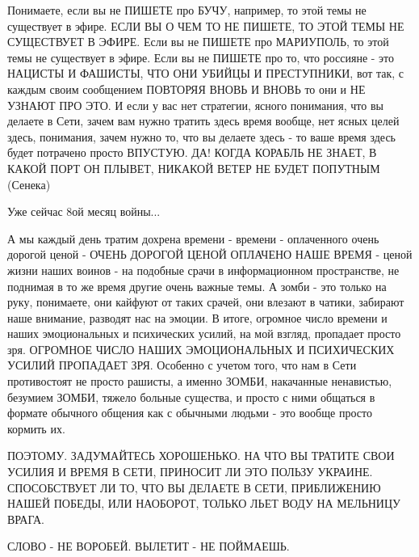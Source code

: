 Понимаете, если вы не ПИШЕТЕ про БУЧУ, например, то этой темы не существует в
эфире. ЕСЛИ ВЫ О ЧЕМ ТО НЕ ПИШЕТЕ, ТО ЭТОЙ ТЕМЫ НЕ СУЩЕСТВУЕТ В ЭФИРЕ. Если вы
не ПИШЕТЕ про МАРИУПОЛЬ, то этой темы не существует в эфире. Если вы не ПИШЕТЕ
про то, что россияне - это НАЦИСТЫ И ФАШИСТЫ, ЧТО ОНИ УБИЙЦЫ И ПРЕСТУПНИКИ, вот
так, с каждым своим сообщением ПОВТОРЯЯ ВНОВЬ И ВНОВЬ то они и НЕ УЗНАЮТ ПРО
ЭТО. И если у вас нет стратегии, ясного понимания, что вы делаете в Сети, зачем
вам нужно тратить здесь время вообще, нет ясных целей здесь, понимания, зачем
нужно то, что вы делаете здесь - то ваше время здесь будет потрачено просто
ВПУСТУЮ. ДА! КОГДА КОРАБЛЬ НЕ ЗНАЕТ, В КАКОЙ ПОРТ ОН ПЛЫВЕТ, НИКАКОЙ ВЕТЕР НЕ
БУДЕТ ПОПУТНЫМ (Сенека)

Уже сейчас 8ой месяц войны...

А мы каждый день тратим дохрена времени - времени - оплаченного очень дорогой
ценой - ОЧЕНЬ ДОРОГОЙ ЦЕНОЙ ОПЛАЧЕНО НАШЕ ВРЕМЯ - ценой жизни наших воинов - на
подобные срачи в информационном пространстве, не поднимая в то же время другие
очень важные темы. А зомби - это только на руку, понимаете, они кайфуют от
таких срачей, они влезают в чатики, забирают наше внимание, разводят нас на
эмоции. В итоге, огромное число времени и наших эмоциональных и психических
усилий, на мой взгляд, пропадает просто зря. ОГРОМНОЕ ЧИСЛО НАШИХ ЭМОЦИОНАЛЬНЫХ
И ПСИХИЧЕСКИХ УСИЛИЙ ПРОПАДАЕТ ЗРЯ. Особенно с учетом того, что нам в Сети
противостоят не просто рашисты, а именно ЗОМБИ, накачанные ненавистью, безумием
ЗОМБИ, тяжело больные существа, и просто с ними общаться в формате обычного
общения как с обычными людьми - это вообще просто кормить их.

ПОЭТОМУ. ЗАДУМАЙТЕСЬ ХОРОШЕНЬКО. НА ЧТО ВЫ ТРАТИТЕ СВОИ УСИЛИЯ И ВРЕМЯ В СЕТИ,
ПРИНОСИТ ЛИ ЭТО ПОЛЬЗУ УКРАИНЕ. СПОСОБСТВУЕТ ЛИ ТО, ЧТО ВЫ ДЕЛАЕТЕ В СЕТИ,
ПРИБЛИЖЕНИЮ НАШЕЙ ПОБЕДЫ, ИЛИ НАОБОРОТ, ТОЛЬКО ЛЬЕТ ВОДУ НА МЕЛЬНИЦУ ВРАГА. 

СЛОВО - НЕ ВОРОБЕЙ. ВЫЛЕТИТ - НЕ ПОЙМАЕШЬ.
